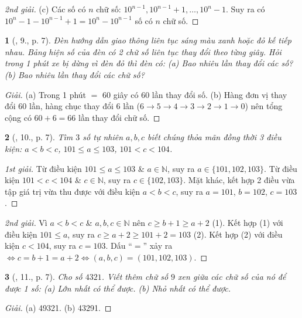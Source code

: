 \documentclass{article}
\newtheorem{baitoan}{}
\begin{document}
\begin{proof}[2nd giải]
	(c) Các số có $n$ chữ số: $10^{n-1},10^{n-1} + 1,\ldots,10^n - 1$. Suy ra có $10^n - 1 - 10^{n-1} + 1 = 10^n - 10^{n-1}$ số có $n$ chữ số.
\end{proof}

\begin{baitoan}[\cite{Tuyen_Toan_6}, 9., p. 7]
	Đèn hướng dẫn giao thông liên tục sáng màu xanh hoặc đỏ kế tiếp nhau. Bảng hiện số của đèn có 2 chữ số liên tục thay đổi theo từng giây. Hỏi trong 1 phút xe bị dừng vì đèn đỏ thì đèn có: (a) Bao nhiêu lần thay đổi các số? (b) Bao nhiêu lần thay đổi các chữ số?
\end{baitoan}

\begin{proof}[Giải]
	(a) Trong 1 phút $=$ 60 giây có 60 lần thay đổi số. (b) Hàng đơn vị thay đổi 60 lần, hàng chục thay đổi 6 lần ($6\to5\to4\to3\to2\to1\to0$) nên tổng cộng có $60 + 6 = 66$ lần thay đổi chữ số.
\end{proof}

\begin{baitoan}[\cite{Tuyen_Toan_6}, 10., p. 7]
	Tìm $3$ số tự nhiên $a,b,c$ biết chúng thỏa mãn đồng thời 3 điều kiện: $a < b < c$, $101\le a\le103$, $101 < c < 104$.
\end{baitoan}

\begin{proof}[1st giải]
	Từ điều kiện $101\le a\le103$ \& $a\in\mathbb{N}$, suy ra $a\in\{101,102,103\}$. Từ điều kiện $101 < c < 104$ \& $c\in\mathbb{N}$, suy ra $c\in\{102,103\}$. Mặt khác, kết hợp 2 điều vừa tập giá trị vừa thu được với điều kiện $a < b < c$, suy ra $a = 101$, $b = 102$, $c = 103$.
\end{proof}

\begin{proof}[2nd giải]
	Vì $a < b < c$ \& $a,b,c\in\mathbb{N}$ nên $c\ge b + 1\ge a + 2$ (1). Kết hợp (1) với điều kiện $101\le a$, suy ra $c\ge a + 2\ge101 + 2 = 103$ (2). Kết hợp (2) với điều kiện $c < 104$, suy ra $c = 103$. Dấu ``$=$'' xảy ra $\Leftrightarrow c = b + 1 = a + 2\Leftrightarrow(a,b,c) = (101,102,103)$.
\end{proof}

\begin{baitoan}[\cite{Tuyen_Toan_6}, 11., p. 7]
	Cho số $4321$. Viết thêm chữ số $9$ xen giữa các chữ số của nó để được 1 số: (a) Lớn nhất có thể được. (b) Nhỏ nhất có thể được.
\end{baitoan}

\begin{proof}[Giải]
	(a) 49321. (b) 43291.
\end{proof}
\end{document}
